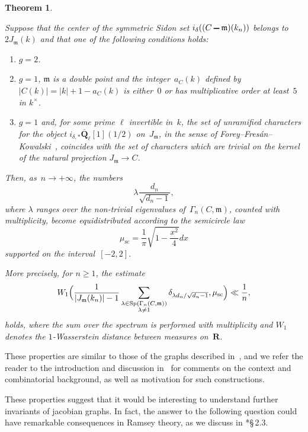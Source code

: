 \documentclass[12pt]{amsart}
\renewcommand{\geq}{\geqslant}
\numberwithin{equation}{section}
\def\setminus{\mathchoice
    {\mathbin{\vrule height .62ex width 1.61ex depth -.38ex}}%
    {\mathbin{\vrule height .62ex width 1.61ex depth -.38ex}}%
    {\mathbin{\vrule height .50ex width 0.85ex depth -.28ex}}%
    {\mathbin{\vrule height .20ex width 0.570ex depth -.24ex}}%
}
\newcommand{\Rr}{\mathbf{R}}
\newcommand{\Qq}{\mathbf{Q}}
\newcommand{\bQl}{\overline{\Qq}_{\ell}}
\newcommand{\mfm}{\mathfrak{m}}
\theoremstyle{plain}
\newtheorem{theorem}{Theorem}[section]
\theoremstyle{remark}
\theoremstyle{definition}
\renewcommand{\geq}{\geqslant}
\begin{document}
\begin{theorem}
\begin{enumth}
  \item\label{it-equi} Suppose that the center of the symmetric Sidon
    set $i_{\delta}((C\setminus \mfm)(k_n))$ belongs to $2J_{\mfm}(k)$
    and that one of the following conditions holds: \smallskip
    \begin{enumerate}
    \item[\textup{(i)}] $g=2$.
    \item[\textup{(ii)}] $g=1$, $\mfm$ is a double point and the
      integer~$a_C(k)$ defined by $|C(k)|=|k|+1-a_C(k)$ is either~$0$ or has
      multiplicative order at least~$5$ in $k^{\times}$.
    \item[\textup{(iii)}] $g=1$ and, for some prime $\ell$ invertible
      in~$k$, the set of unramified characters for the object
      $i_{\delta,*}\bQl[1](1/2)$ on~$J_{\mfm}$, in the sense of
      Forey--Fresán--Kowalski~\cite{ffk}, coincides with the set of
      characters which are trivial on the kernel of the natural
      projection $J_{\mfm}\to C$.
    \end{enumerate} Then, as~$n\to+\infty$, the numbers
    \[
      \lambda \frac{d_n}{\sqrt{d_n-1}},
    \]
    where $\lambda$ ranges over the non-trivial eigenvalues
    of~$\Gamma_n(C,\mfm)$, counted with multiplicity, become
    equidistributed according to the semicircle
    law
    \[
      \mu_{\mathrm{sc}}=\frac{1}{\pi}\sqrt{1-\frac{x^2}{4}}dx
    \]
    supported on the interval~$[-2,2]$.
 
   \item More precisely, for $n\geq 1$, the estimate
    \begin{equation}\label{it-w1}
      W_1\Bigl( \frac{1}{|J_{\mfm}(k_n)|-1} \sum_{\substack{\lambda\in
        \mathrm{Sp}(\Gamma_n(C,\mfm))\\\lambda\not=1}} \delta_{\lambda
      d_n/\sqrt{d_n-1}},
      \mu_{\mathrm{sc}}
      \Bigr)\ll \frac{1}{n},
    \end{equation}
    holds, where the sum over the spectrum is performed with
    multiplicity and $W_1$ denotes the $1$-Wasserstein distance between
    measures on~$\Rr$.
  \end{enumth}
\end{theorem}

These properties are similar to those of the graphs described
in~\cite{short}, and we refer the reader to the introduction and discussion
in~\cite{short} for comments on the context and combinatorial
background, as well as motivation for such constructions.

These properties suggest that it would be interesting to understand
further invariants of jacobian graphs. In fact, the answer to the
following question could have remarkable consequences in Ramsey theory, as we discuss in \cite{short}*{\S\,2.3}. 
\end{document}
